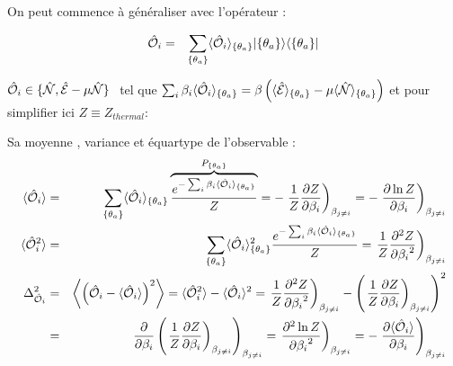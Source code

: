 	On peut commence à généraliser avec l'opérateur :
	
	
	\begin{eqnarray}
		\hat{\mathbf{\mathcal{O}}}_i & = & \sum_{\{\theta_a \}} \langle \hat{\mathbf{\mathcal{O}}}_i \rangle_{\{\theta_a \}}  \vert \{ \theta_a\}\rangle	\langle \{ \theta_a \}\vert
	\end{eqnarray}
	
	$\operator{\mathcal{O}}_i \in \{\operator{\mathcal{N}} , \operator{\mathcal{E}} - \mu \operator{\mathcal{N}} \} $  tel que $\sum_i \beta_i \langle \hat{\mathbf{\mathcal{O}}}_i \rangle_{\{\theta_a \}} = \beta \left ( \langle \hat{\mathbf{\mathcal{E}}} \rangle_{\{\theta_a \}}   - \mu \langle \hat{\mathbf{\mathcal{N}}} \rangle_{\{\theta_a \}} \right ) $ et pour simplifier ici $Z \equiv Z_{thermal}$:
	
	\begin{aff}
	Sa  moyenne , variance et équartype de l'observable :
	\begin{eqnarray}
		\langle\hat{\mathbf{\mathcal{O}}}_i \rangle & = & \sum_{\{\theta_a \}} 	\langle \hat{\mathbf{\mathcal{O}}}_i \rangle_{\{\theta_a \}} \overbrace{\frac{e^{-\sum_i \beta_i \langle \hat{\mathbf{\mathcal{O}}}_i \rangle_{\{\theta_a \}} }}{Z}}^{P_{\{\theta_a \}}} = - \left .\frac{1}{Z}\frac{ \partial Z }{ \partial \beta_i } \right )_{\beta_{j\neq i}} =  - \left .\frac{ \partial \ln Z }{ \partial \beta_i }  \right )_{\beta_{j\neq i}}\\
		\langle\hat{\mathbf{\mathcal{O}}}_i^2 \rangle & = & \sum_{\{\theta_a \} } 	\langle \hat{\mathbf{\mathcal{O}}}_i \rangle_{\{\theta_a \}}^2 \frac{e^{-\sum_i \beta_i \langle \hat{\mathbf{\mathcal{O}}}_i \rangle_{\{\theta_a \}} }}{Z} = \left . \frac{1}{Z} \frac{ \partial^2 Z }{ {\partial \beta_i}^2 }  \right )_{\beta_{j\neq i}} \notag \\
		\Delta_{\hat{\mathbf{\mathcal{O}}}_i}^2  & = & 	\left \langle \left (\hat{\mathbf{\mathcal{O}}}_i - \langle\hat{\mathbf{\mathcal{O}}}_i \rangle \right )^2  \right \rangle  = 	\langle\hat{\mathbf{\mathcal{O}}}_i^2 \rangle  -  \langle\hat{\mathbf{\mathcal{O}}}_i \rangle^2 = \left . \frac{1}{Z} \frac{ \partial^2 Z }{ {\partial \beta_i}^2 }  \right )_{\beta_{j\neq i}} - \left ( \left . \frac{1}{Z}\frac{ \partial Z }{ \partial \beta_i }  \right )_{\beta_{j\neq i}}\right )^2  \\
		& = & \frac{\partial}{\partial \beta_i } \left ( \left . \frac{1}{Z} \frac{\partial Z}{\partial \beta_i }  \right )_{\beta_{j\neq i}}  \right )_{\beta_{j\neq i}} =  \left . \frac{\partial^2 \ln Z  }{{\partial \beta_i}^2 }  \right )_{\beta_{j\neq i}}  = - \left . 	\frac{\partial \langle\hat{\mathbf{\mathcal{O}}}_i \rangle }{\partial \beta_i } \right )_{\beta_{j\neq i}}
	\end{eqnarray}
	\end{aff}
	
